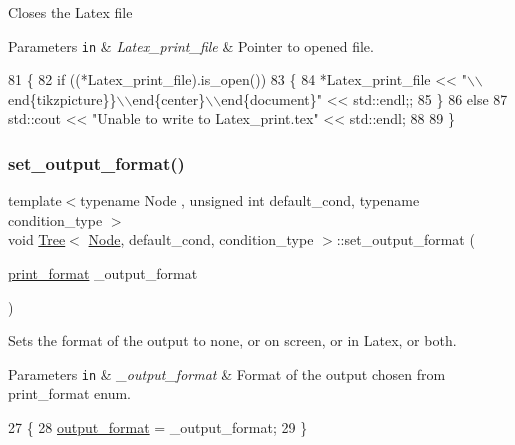 Closes the Latex file 
\begin{DoxyParams}[1]{Parameters}
\mbox{\tt in}  & {\em Latex\+\_\+print\+\_\+file} & Pointer to opened file. \\
\hline
\end{DoxyParams}

\begin{DoxyCode}
81 \{
82     \textcolor{keywordflow}{if} ((*Latex\_print\_file).is\_open())
83     \{
84         *Latex\_print\_file << \textcolor{stringliteral}{"\(\backslash\)\(\backslash\)end\{tikzpicture\}\}\(\backslash\)\(\backslash\)end\{center\}\(\backslash\)\(\backslash\)end\{document\}"} << std::endl;;
85     \}
86     \textcolor{keywordflow}{else}
87         std::cout << \textcolor{stringliteral}{"Unable to write to Latex\_print.tex"} << std::endl;
88     
89 \}
\end{DoxyCode}
\mbox{\label{class_tree_a8e176aced327c226e89a3790cb8f3d68}} 
\subsubsection{\texorpdfstring{set\+\_\+output\+\_\+format()}{set\_output\_format()}}
{\footnotesize\ttfamily template$<$typename Node , unsigned int default\+\_\+cond, typename condition\+\_\+type $>$ \\
void \hyperlink{class_tree}{Tree}$<$ \hyperlink{struct_node}{Node}, default\+\_\+cond, condition\+\_\+type $>$\+::set\+\_\+output\+\_\+format (\begin{DoxyParamCaption}\item[{\hyperlink{_tree_8hpp_a73f5f76e6617ce240bad0b57b80be996}{print\+\_\+format}}]{\+\_\+output\+\_\+format }\end{DoxyParamCaption})}

Sets the format of the output to none, or on screen, or in Latex, or both. 
\begin{DoxyParams}[1]{Parameters}
\mbox{\tt in}  & {\em \+\_\+output\+\_\+format} & Format of the output chosen from print\+\_\+format {\ttfamily enum}. \\
\hline
\end{DoxyParams}

\begin{DoxyCode}
27 \{
28     \hyperlink{class_tree_aeaf14b04be7b3de8214fcc5c1545ebde}{output\_format} = \_output\_format;
29 \}
\end{DoxyCode}
\mbox{\label{class_tree_a21f8cfc7ca1e7bd8fe8c33c94240449f}} 
